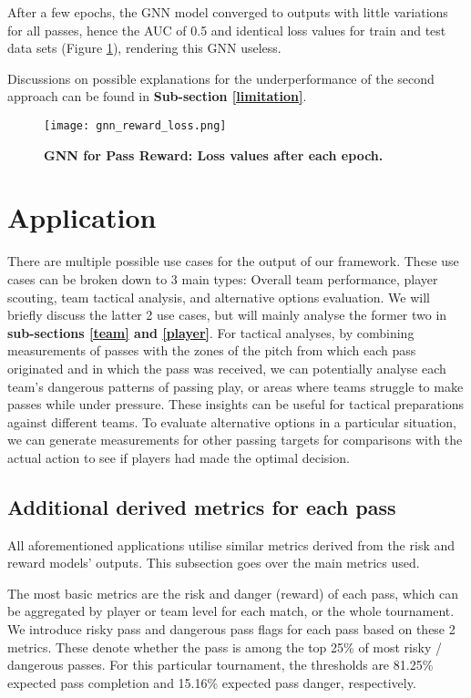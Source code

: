 \documentclass[conference]{IEEEtran}
\begin{document}
After a few epochs, the GNN model converged to outputs with little variations for all passes, hence the AUC of 0.5 and identical loss values for train and test data sets (Figure \ref{gnnrewardresult}), rendering this GNN useless. 


Discussions on possible explanations for the underperformance of the second approach can be found in \textbf{Sub-section \ref{limitation}}.

\begin{figure}[htbp]

\centerline{\texttt{[image: gnn\_reward\_loss.png]}}
\caption{\textbf{GNN for Pass Reward: Loss values after each epoch.}}
\label{gnnrewardresult}
\end{figure}

\section{Application}

There are multiple possible use cases for the output of our framework. These use cases can be broken down to 3 main types: Overall team performance, player scouting, team tactical analysis, and alternative options evaluation. We will briefly discuss the latter 2 use cases, but will mainly analyse the former two in \textbf{sub-sections \ref{team} and \ref{player}}. For tactical analyses, by combining measurements of passes with the zones of the pitch from which each pass originated and in which the pass was received, we can potentially analyse each team's dangerous patterns of passing play, or areas where teams struggle to make passes while under pressure. These insights can be useful for tactical preparations against different teams. To evaluate alternative options in a particular situation, we can generate measurements for other passing targets for comparisons with the actual action to see if players had made the optimal decision.

\subsection{Additional derived metrics for each pass}
All aforementioned applications utilise similar metrics derived from the risk and reward models' outputs. This subsection goes over the main metrics used.

The most basic metrics are the risk and danger (reward) of each pass, which can be aggregated by player or team level for each match, or the whole tournament. We introduce risky pass and dangerous pass flags for each pass based on these 2 metrics. These denote whether the pass is among the top 25\% of most risky / dangerous passes. For this particular tournament, the thresholds are 81.25\% expected pass completion and 15.16\% expected pass danger, respectively.
\end{document}
